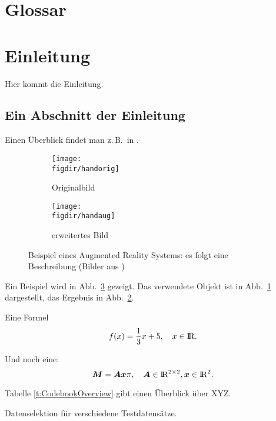 \section{Glossar}


\section{Einleitung}
\label{s:intro}

Hier kommt die Einleitung.


\subsection{Ein Abschnitt der Einleitung}
\label{ss:intro:abc}

Einen Überblick findet man z.\,B.\ in \cite{Auer00:HTF}.

\begin{figure}[t]
	\centering
	
	\begin{subfigure}{0.45\linewidth}
		\centering
		\texttt{[image: \\figdir/handorig]}
		\caption{Originalbild}
		\label{FIG:arexorig}
	\end{subfigure}
	\begin{subfigure}{0.45\linewidth}
		\centering
		\texttt{[image: \\figdir/handaug]}
		\caption{erweitertes Bild}
		\label{FIG:arexaugm}
	\end{subfigure}
	\caption[AR Beispiel]
	{Beispiel eines Augmented Reality Systems: es folgt eine Beschreibung (Bilder aus \cite{Schmidt01:PAO})}
	\label{FIG:arex}
\end{figure}

Ein Beispiel wird in Abb.\ \ref{FIG:arex} gezeigt.
Das verwendete Objekt ist in Abb.\ \ref{FIG:arexorig} dargestellt, das Ergebnis in Abb.\ \ref{FIG:arexaugm}.

Eine Formel
\begin{equation}
\label{eq:cvp:test}
f(x) = \frac{1}{3} x + 5, \quad x \in \mathord{\mathrm{I\!R}}.
\end{equation}

Und noch eine:
\begin{equation}
\label{eq:cvp:matvec}
\bm{M}  = \bm{Ax} \pi, \quad \bm{A} \in \mathord{\mathrm{I\!R}}^{2 \times 2}, \bm{x} \in \mathord{\mathrm{I\!R}}^2.
\end{equation}

Tabelle \ref{t:CodebookOverview} gibt einen Überblick über XYZ.

\begin{table}[t]
	\centering\small
	
	\caption[Testtabelle]{Datenselektion für verschiedene Testdatensätze.}
	\label{t:CodebookOverview}
\end{table}


